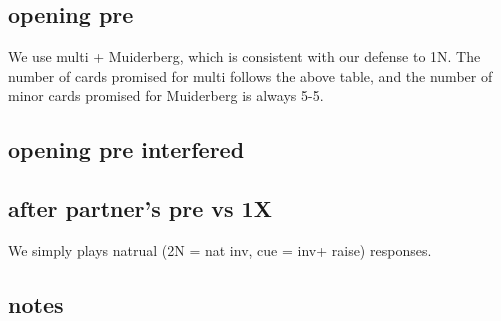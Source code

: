 
\subsection{opening pre}

We use multi + Muiderberg, which is consistent with our defense to 1N. The number of cards promised for multi follows the above table, 
and the number of minor cards promised for Muiderberg is always 5-5.


\subsection{opening pre interfered}


\subsection{after partner's pre vs 1X}

We simply plays natrual (2N = nat inv, cue = inv+ raise) responses.


\subsection{notes}

